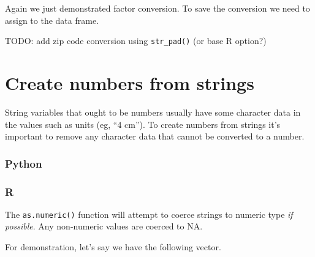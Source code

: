 \documentclass[
]{book}
\newenvironment{Shaded}{\begin{snugshade}}{\end{snugshade}}
\newcommand{\AttributeTok}[1]{\textcolor[rgb]{0.77,0.63,0.00}{#1}}
\newcommand{\CommentTok}[1]{\textcolor[rgb]{0.56,0.35,0.01}{\textit{#1}}}
\newcommand{\DecValTok}[1]{\textcolor[rgb]{0.00,0.00,0.81}{#1}}
\newcommand{\ErrorTok}[1]{\textcolor[rgb]{0.64,0.00,0.00}{\textbf{#1}}}
\newcommand{\FunctionTok}[1]{\textcolor[rgb]{0.00,0.00,0.00}{#1}}
\newcommand{\NormalTok}[1]{#1}
\newcommand{\OtherTok}[1]{\textcolor[rgb]{0.56,0.35,0.01}{#1}}
\newcommand{\SpecialCharTok}[1]{\textcolor[rgb]{0.00,0.00,0.00}{#1}}
\newcommand{\StringTok}[1]{\textcolor[rgb]{0.31,0.60,0.02}{#1}}
\begin{document}
Again we just demonstrated factor conversion. To save the conversion we need to assign to the data frame.

\begin{Shaded}
\end{Shaded}

TODO: add zip code conversion using \texttt{str\_pad()} (or base R option?)

\hypertarget{create-numbers-from-strings}{%
\section{Create numbers from strings}\label{create-numbers-from-strings}}

String variables that ought to be numbers usually have some character data in the values such as units (eg, ``4 cm''). To create numbers from strings it's important to remove any character data that cannot be converted to a number.

\hypertarget{python-19}{%
\subsubsection*{Python}\label{python-19}}

\hypertarget{r-19}{%
\subsubsection*{R}\label{r-19}}

The \texttt{as.numeric()} function will attempt to coerce strings to numeric type \emph{if possible}. Any non-numeric values are coerced to NA.

For demonstration, let's say we have the following vector.
\end{document}

